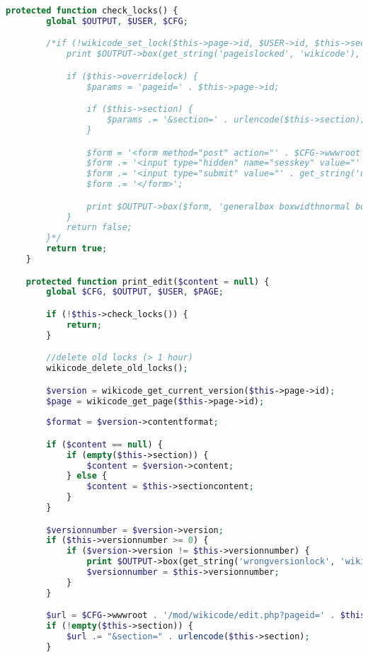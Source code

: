 \begin{lstlisting}[language=PHP]
    protected function check_locks() {
        global $OUTPUT, $USER, $CFG;

        /*if (!wikicode_set_lock($this->page->id, $USER->id, $this->section, true)) {
            print $OUTPUT->box(get_string('pageislocked', 'wikicode'), 'generalbox boxwidthnormal boxaligncenter');

            if ($this->overridelock) {
                $params = 'pageid=' . $this->page->id;

                if ($this->section) {
                    $params .= '&section=' . urlencode($this->section);
                }

                $form = '<form method="post" action="' . $CFG->wwwroot . '/mod/wikicode/overridelocks.php?' . $params . '">';
                $form .= '<input type="hidden" name="sesskey" value="' . sesskey() . '" />';
                $form .= '<input type="submit" value="' . get_string('overridelocks', 'wikicode') . '" />';
                $form .= '</form>';

                print $OUTPUT->box($form, 'generalbox boxwidthnormal boxaligncenter');
            }
            return false;
        }*/
        return true;
    }

    protected function print_edit($content = null) {
        global $CFG, $OUTPUT, $USER, $PAGE;

        if (!$this->check_locks()) {
            return;
        }

        //delete old locks (> 1 hour)
        wikicode_delete_old_locks();

        $version = wikicode_get_current_version($this->page->id);
		$page = wikicode_get_page($this->page->id);
		
        $format = $version->contentformat;

        if ($content == null) {
            if (empty($this->section)) {
                $content = $version->content;
            } else {
                $content = $this->sectioncontent;
            }
        }

        $versionnumber = $version->version;
        if ($this->versionnumber >= 0) {
            if ($version->version != $this->versionnumber) {
                print $OUTPUT->box(get_string('wrongversionlock', 'wikicode'), 'errorbox');
                $versionnumber = $this->versionnumber;
            }
        }

        $url = $CFG->wwwroot . '/mod/wikicode/edit.php?pageid=' . $this->page->id;
        if (!empty($this->section)) {
            $url .= "&section=" . urlencode($this->section);
        }


\end{lstlisting}

